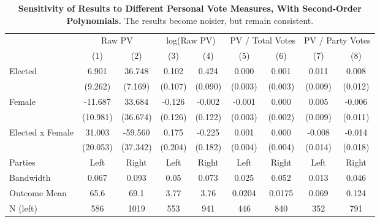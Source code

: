 \begin{table}[!h]

\caption{\label{tab:norway_pv_check_poly} \textbf{Sensitivity of Results to Different Personal Vote Measures, With Second-Order Polynomials.} The results become noisier, but remain consistent.}
\centering
\fontsize{9}{11}\selectfont
\begin{threeparttable}
\begin{tabular}[t]{lcccccccc}
\toprule
\multicolumn{1}{c}{ } & \multicolumn{2}{c}{Raw PV} & \multicolumn{2}{c}{log(Raw PV)} & \multicolumn{2}{c}{PV / Total Votes} & \multicolumn{2}{c}{PV / Party Votes} \\
\cmidrule(l{3pt}r{3pt}){2-3} \cmidrule(l{3pt}r{3pt}){4-5} \cmidrule(l{3pt}r{3pt}){6-7} \cmidrule(l{3pt}r{3pt}){8-9}
  & \multicolumn{1}{c}{(1)} & \multicolumn{1}{c}{(2)} & \multicolumn{1}{c}{(3)} & \multicolumn{1}{c}{(4)} & \multicolumn{1}{c}{(5)} & \multicolumn{1}{c}{(6)} & \multicolumn{1}{c}{(7)} & \multicolumn{1}{c}{(8)}\\
\midrule
Elected & 6.901 & 36.748 & 0.102 & 0.424 & 0.000 & 0.001 & 0.011 & 0.008\\
 & (9.262) & (7.169) & (0.107) & (0.090) & (0.003) & (0.003) & (0.009) & (0.012)\\
\addlinespace
Female & -11.687 & 33.684 & -0.126 & -0.002 & -0.001 & 0.000 & 0.005 & -0.006\\
 & (10.981) & (36.674) & (0.126) & (0.122) & (0.003) & (0.002) & (0.009) & (0.011)\\
\addlinespace
Elected x Female & 31.003 & -59.560 & 0.175 & -0.225 & 0.001 & 0.000 & -0.008 & -0.014\\
 & (20.053) & (37.342) & (0.204) & (0.182) & (0.004) & (0.004) & (0.014) & (0.018)\\
\addlinespace \midrule \addlinespace
\addlinespace
Parties & \multicolumn{1}{c}{Left} & \multicolumn{1}{c}{Right} & \multicolumn{1}{c}{Left} & \multicolumn{1}{c}{Right} & \multicolumn{1}{c}{Left} & \multicolumn{1}{c}{Right} & \multicolumn{1}{c}{Left} & \multicolumn{1}{c}{Right}\\
Bandwidth & 0.067 & 0.093 & 0.05 & 0.073 & 0.025 & 0.052 & 0.013 & 0.046\\
Outcome Mean & 65.6 & 69.1 & 3.77 & 3.76 & 0.0204 & 0.0175 & 0.069 & 0.124\\
N (left) & \multicolumn{1}{c}{586} & \multicolumn{1}{c}{1019} & \multicolumn{1}{c}{553} & \multicolumn{1}{c}{941} & \multicolumn{1}{c}{446} & \multicolumn{1}{c}{840} & \multicolumn{1}{c}{352} & \multicolumn{1}{c}{791}\\

\end{tabular}
\end{threeparttable}
\end{table}
